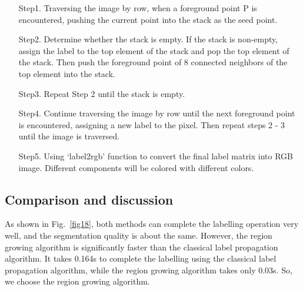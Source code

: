 \documentclass[hyperref]{article}
\theoremstyle{nonumberplain}
\begin{document}
	\begin{itemize}
		\item[Step1. ] Traversing the image by row, when a foreground point P is encountered, pushing the current point into the stack as the seed point.
		\item[Step2. ] Determine whether the stack is empty. If the stack is non-empty, assign the label to the top element of the stack and pop the top element of the stack. Then push the foreground point of 8 connected neighbors of the top element into the stack.
		\item[Step3. ] Repeat Step 2 until the stack is empty.
		\item[Step4. ] Continue traversing the image by row until the next foreground point is encountered, assigning a new label to the pixel. Then repeat steps 2 - 3 until the image is traversed.
		\item[Step5. ] Using ‘label2rgb’ function to convert the final label matrix into RGB image. Different components will be colored with different colors.
		
	\end{itemize}
	
	\subsection{Comparison and discussion}
	
	\hspace{1.0em}
	As shown in Fig.~\ref{fig18}, both methods can complete the labelling operation very well, and the segmentation quality is about the same. However, the region growing algorithm is significantly faster than the classical label propagation algorithm. It takes 0.164s to complete the labelling using the classical label propagation algorithm, while the region growing algorithm takes only 0.03s. So, we choose the region growing algorithm.
	
\end{document}
